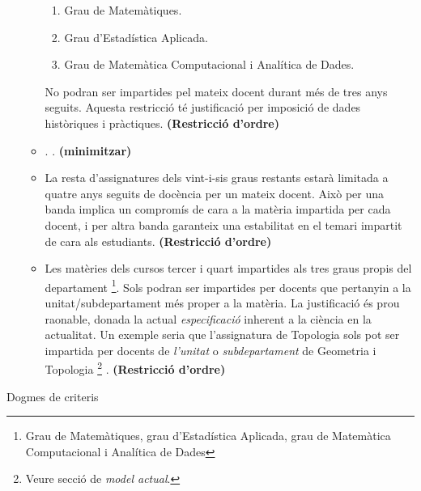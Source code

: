 \documentclass[10pt,twocolumn]{article}
\begin{document}
\begin{enumerate}
\begin{itemize}
    	\begin{enumerate} 
    		\item Grau de Matemàtiques.
    		\item Grau d'Estadística Aplicada.
    		\item Grau de Matemàtica Computacional i Analítica de Dades.
    	\end{enumerate}
      No podran ser impartides pel mateix docent durant més de tres anys seguits.
      {\color{gray} Aquesta restricció té justificació per imposició de dades històriques i pràctiques.} \textbf{(Restricció d'ordre)} 
    	\item  . {\color{gray} .} \textbf{(minimitzar)} 
    	\item La resta d'assignatures dels vint-i-sis graus restants estarà limitada a quatre anys seguits de docència per un mateix docent. {\color{gray} Això per una banda implica un compromís de cara a la matèria impartida per cada docent, i per altra banda garanteix una estabilitat en el temari impartit de cara als estudiants.} \textbf{(Restricció d'ordre)} 
    	\item  Les matèries  dels cursos tercer i quart impartides als tres graus propis del departament \footnote{Grau de Matemàtiques, grau d'Estadística Aplicada, grau de Matemàtica Computacional i Analítica de Dades}. Sols podran ser impartides per docents que pertanyin a la unitat/subdepartament més proper a la matèria.   {\color{gray} La justificació és prou raonable, donada la actual \textit{especificació} inherent a la ciència en la actualitat. Un exemple seria que l'assignatura de Topologia sols pot ser impartida per docents de \textit{l'unitat} o \textit{subdepartament} de Geometria i Topologia \footnote{Veure secció de  \textit{model actual}.} .} \textbf{(Restricció d'ordre)} 
    \end{itemize}																																					
   
\end{enumerate}
Dogmes de criteris
\footnotesize


\end{document}
